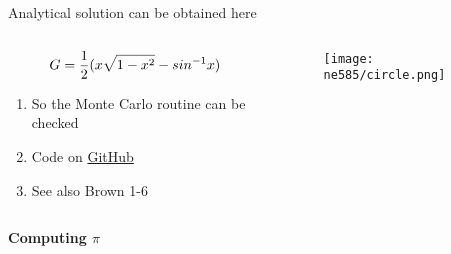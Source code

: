 \documentclass[aspectratio=1610,pdftex,dvipsnames,compress,xcolor={dvipsnames}]{beamer}
\begin{document}
\begin{frame}{Analytical solution can be obtained here}
    \begin{columns}[t]

        \begin{column}{0.55\textwidth}
            \begin{equation}
                \LARGE
                G = \frac{1}{2}(x\sqrt{1-x^2}-sin^{-1} x)
            \end{equation}

            \vspace*{\fill}
            
            \begin{enumerate}[series=outerlist,topsep=0pt,itemsep=21pt,leftmargin=*,label=(\arabic*)]
                \item[]So the Monte Carlo routine can be checked
                \item[]Code on \href{https://github.com/TheDoctorRAB/education/blob/master/src/monte.carlo.simple.py}{GitHub}
                \item[]See also Brown 1-6
            \end{enumerate}
        \end{column}

        \begin{column}{0.45\textwidth}
            \begin{figure}
                \centering
                \texttt{[image: ne585/circle.png]}
            \end{figure}
        \end{column}

    \end{columns}
\end{frame}


\begin{frame}[plain]{}
    \centering\LARGE\textbf{Computing $\pi$}
\end{frame}
\end{document}
